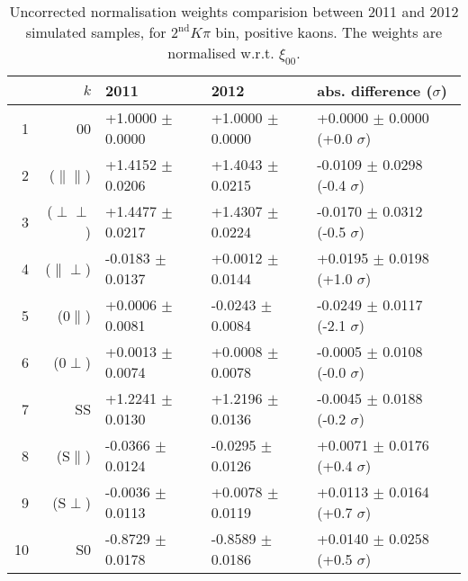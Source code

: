 \begin{table}[hbtp]
  \caption{\small Uncorrected normalisation weights comparision between 2011 and 2012 simulated samples, for $2^{\text{nd}}K\pi$ bin, positive kaons. The weights are normalised w.r.t. $\xi_{00}$.}
  \center\footnotesize
  \begin{tabular}{r r l l l}      
    \multicolumn{2}{r}{$k$}           & 2011             & 2012              &   abs. difference ($\sigma$)        \\
   \hline
  1  & 00                   & +1.0000 $\pm$  0.0000  &  +1.0000 $\pm$  0.0000  &  +0.0000 $\pm$  0.0000 (+0.0 $\sigma$) \\
  2  & ($\parallel\parallel$) & +1.4152 $\pm$  0.0206  &  +1.4043 $\pm$  0.0215  &  -0.0109 $\pm$  0.0298 (-0.4 $\sigma$) \\
  3  & ($\perp\perp$)       & +1.4477 $\pm$  0.0217  &  +1.4307 $\pm$  0.0224  &  -0.0170 $\pm$  0.0312 (-0.5 $\sigma$) \\
  4  & ($\parallel\perp$)   & -0.0183 $\pm$  0.0137  &  +0.0012 $\pm$  0.0144  &  +0.0195 $\pm$  0.0198 (+1.0 $\sigma$) \\
  5  & ($0\parallel$)       & +0.0006 $\pm$  0.0081  &  -0.0243 $\pm$  0.0084  &  -0.0249 $\pm$  0.0117 (-2.1 $\sigma$) \\
  6  & ($0\perp$)           & +0.0013 $\pm$  0.0074  &  +0.0008 $\pm$  0.0078  &  -0.0005 $\pm$  0.0108 (-0.0 $\sigma$) \\
  7  & SS                   & +1.2241 $\pm$  0.0130  &  +1.2196 $\pm$  0.0136  &  -0.0045 $\pm$  0.0188 (-0.2 $\sigma$) \\
  8  & (S$\parallel$)       & -0.0366 $\pm$  0.0124  &  -0.0295 $\pm$  0.0126  &  +0.0071 $\pm$  0.0176 (+0.4 $\sigma$) \\
  9  & (S$\perp$)           & -0.0036 $\pm$  0.0113  &  +0.0078 $\pm$  0.0119  &  +0.0113 $\pm$  0.0164 (+0.7 $\sigma$) \\
  10 &  S0                   & -0.8729 $\pm$  0.0178  &  -0.8589 $\pm$  0.0186  &  +0.0140 $\pm$  0.0258 (+0.5 $\sigma$) \\
\hline
\end{tabular}
\end{table}
